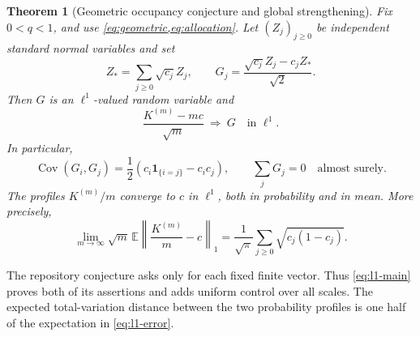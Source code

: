 \documentclass[11pt,a4paper]{article}
\numberwithin{equation}{section}
\newtheorem{theorem}{Theorem}[section]
\theoremstyle{definition}
\theoremstyle{remark}
\newcommand{\E}{\mathbb E}
\newcommand{\Cov}{\operatorname{Cov}}
\newcommand{\ind}{\mathbf 1}
\begin{document}
\begin{theorem}[Geometric occupancy conjecture and global strengthening]
\label{thm:main-geometric}
Fix $0<q<1$, and use \cref{eq:geometric,eq:allocation}. Let $(Z_j)_{j\ge0}$
be independent standard normal variables and set
\begin{equation}
Z_* =\sum_{j\ge0}\sqrt{c_j}Z_j,
\qquad
G_j=\frac{\sqrt{c_j}Z_j-c_jZ_*}{\sqrt2}.
\label{eq:bridge}
\end{equation}
Then $G$ is an $\ell^1$-valued random variable and
\begin{equation}
\frac{K^{(m)}-mc}{\sqrt m}\ \Longrightarrow\ G
\quad\text{in }\ell^1.
\label{eq:l1-main}
\end{equation}
In particular,
\begin{equation}
\Cov(G_i,G_j)=\frac12(c_i\ind_{\{i=j\}}-c_ic_j),
\qquad \sum_jG_j=0\quad\text{almost surely}.
\label{eq:covariance}
\end{equation}
The profiles $K^{(m)}/m$ converge to $c$ in $\ell^1$, both in probability
and in mean. More precisely,
\begin{equation}
\lim_{m\to\infty}\sqrt m\,
\E\left\|\frac{K^{(m)}}m-c\right\|_1
=\frac1{\sqrt\pi}\sum_{j\ge0}\sqrt{c_j(1-c_j)}.
\label{eq:l1-error}
\end{equation}
\end{theorem}

The repository conjecture asks only for each fixed finite vector. Thus
\cref{eq:l1-main} proves both of its assertions and adds uniform control
over all scales. The expected total-variation distance between the two
probability profiles is one half of the expectation in \cref{eq:l1-error}.
\end{document}
